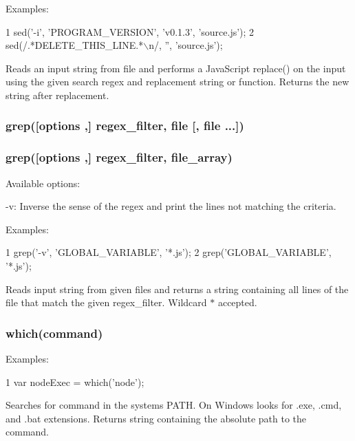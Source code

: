 Examples\+:


\begin{DoxyCode}
1 sed('-i', 'PROGRAM\_VERSION', 'v0.1.3', 'source.js');
2 sed(/.*DELETE\_THIS\_LINE.*\(\backslash\)n/, '', 'source.js');
\end{DoxyCode}


Reads an input string from {\ttfamily file} and performs a Java\+Script {\ttfamily replace()} on the input using the given search regex and replacement string or function. Returns the new string after replacement.

\subsubsection*{grep(\mbox{[}options ,\mbox{]} regex\+\_\+filter, file \mbox{[}, file ...\mbox{]})}

\subsubsection*{grep(\mbox{[}options ,\mbox{]} regex\+\_\+filter, file\+\_\+array)}

Available options\+:


\begin{DoxyItemize}
\item {\ttfamily -\/v}\+: Inverse the sense of the regex and print the lines not matching the criteria.
\end{DoxyItemize}

Examples\+:


\begin{DoxyCode}
1 grep('-v', 'GLOBAL\_VARIABLE', '*.js');
2 grep('GLOBAL\_VARIABLE', '*.js');
\end{DoxyCode}


Reads input string from given files and returns a string containing all lines of the file that match the given {\ttfamily regex\+\_\+filter}. Wildcard {\ttfamily $\ast$} accepted.

\subsubsection*{which(command)}

Examples\+:


\begin{DoxyCode}
1 var nodeExec = which('node');
\end{DoxyCode}


Searches for {\ttfamily command} in the system\textquotesingle{}s P\+A\+T\+H. On Windows looks for {\ttfamily .exe}, {\ttfamily .cmd}, and {\ttfamily .bat} extensions. Returns string containing the absolute path to the command.

